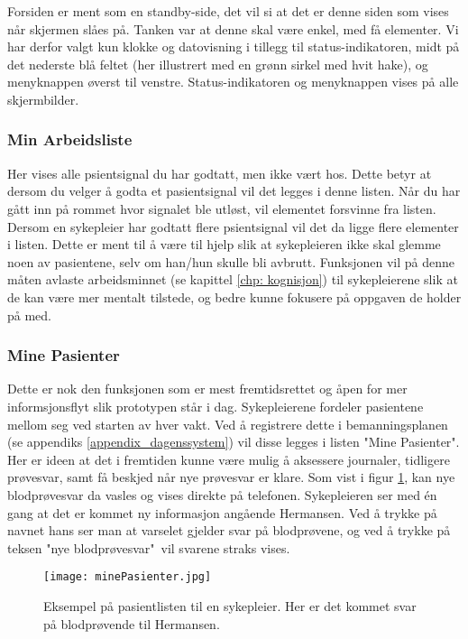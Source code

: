 \noindent
Forsiden er ment som en standby-side, det vil si at det er denne siden som vises når skjermen slåes på. Tanken var at denne skal være enkel, med få elementer. Vi har derfor valgt kun klokke og datovisning i tillegg til status-indikatoren, midt på det nederste blå feltet (her illustrert med en grønn sirkel med hvit hake), og menyknappen øverst til venstre. Status-indikatoren og menyknappen vises på alle skjermbilder. 

\subsubsection{Min Arbeidsliste}
Her vises alle psientsignal du har godtatt, men ikke vært hos. Dette betyr at dersom du velger å godta et pasientsignal vil det legges i denne listen. Når du har gått inn på rommet hvor signalet ble utløst, vil elementet forsvinne fra listen. Dersom en sykepleier har godtatt flere psientsignal vil det da ligge flere elementer i listen. Dette er ment til å være til hjelp slik at sykepleieren ikke skal glemme noen av pasientene, selv om han/hun skulle bli avbrutt. Funksjonen vil på denne måten avlaste arbeidsminnet (se kapittel \ref{chp: kognisjon}) til sykepleierene slik at de kan være mer mentalt tilstede, og bedre kunne fokusere på oppgaven de holder på med.

\subsubsection{Mine Pasienter}
Dette er nok den funksjonen som er mest fremtidsrettet og åpen for mer informsjonsflyt slik prototypen står i dag. Sykepleierene fordeler pasientene mellom seg ved starten av hver vakt. Ved å registrere dette i bemanningsplanen (se appendiks \ref{appendix_dagenssystem}) vil disse legges i listen "Mine Pasienter". Her er ideen at det i fremtiden kunne være mulig å aksessere journaler, tidligere prøvesvar, samt få beskjed når nye prøvesvar er klare. Som vist i figur \ref{minePasienter}, kan nye blodprøvesvar da vasles og vises direkte på telefonen. Sykepleieren ser med én gang at det er kommet ny informasjon angående Hermansen. Ved å trykke på navnet hans ser man at varselet gjelder svar på blodprøvene, og ved å trykke på teksen "nye blodprøvesvar"\ vil svarene straks vises.

\begin{figure}[H]
\centering
\texttt{[image: minePasienter.jpg]}
\caption{Eksempel på pasientlisten til en sykepleier. Her er det kommet svar på blodprøvende til Hermansen.}
\label{minePasienter}
\end{figure}

